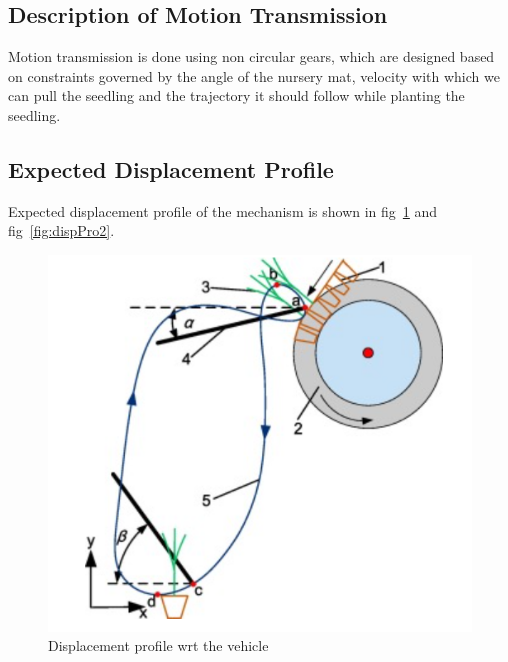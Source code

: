 \documentclass[a4paper,latin,center,onecolumn]{paper}
\begin{document}
        \subsection{Description of Motion Transmission}
            Motion transmission is done using non circular gears, which are designed based on constraints governed by the angle of the nursery mat, velocity with which we can pull the seedling and the trajectory it should follow while planting the seedling.

        \subsection{Expected Displacement Profile}
            Expected displacement profile of the mechanism is shown in fig~\ref{fig:dispPro1} and fig~\ref{fig:dispPro2}.

            \begin{figure}[hbt!]
                \centering
                \includegraphics[width=0.9\columnwidth]{Images/displacement_profile_1.png}
                \caption{Displacement profile wrt the vehicle}
                \label{fig:dispPro1}
            \end{figure}
\end{document}
